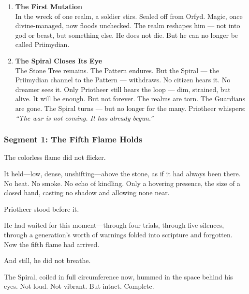 \documentclass[9pt]{article}
\begin{document}
\begin{enumerate}
    \vspace{1em}
    \item \textbf{The First Mutation} \\
    In the wreck of one realm, a soldier stirs. Sealed off from Orfyd. Magic, once divine-managed, now floods unchecked. The realm reshapes him — not into god or beast, but something else. He does not die. But he can no longer be called Priimydian.

    \vspace{1em}
    \item \textbf{The Spiral Closes Its Eye} \\
    The Stone Tree remains. The Pattern endures. But the Spiral — the Priimydian channel to the Pattern — withdraws. No citizen hears it. No dreamer sees it. Only Priotheer still hears the loop — dim, strained, but alive. It will be enough. But not forever. The realms are torn. The Guardians are gone. The Spiral turns — but no longer for the many. Priotheer whispers: \textit{“The war is not coming. It has already begun.”}
\end{enumerate}

\newpage

\subsubsection*{Segment 1: The Fifth Flame Holds}

The colorless flame did not flicker.

\vspace{0.5em}
It held---low, dense, unshifting---above the stone, as if it had always been there. No heat. No smoke. No echo of kindling. Only a hovering presence, the size of a closed hand, casting no shadow and allowing none near.

\vspace{0.5em}
Priotheer stood before it.

\vspace{0.5em}
He had waited for this moment---through four trials, through five silences, through a generation’s worth of warnings folded into scripture and forgotten. Now the fifth flame had arrived.

\vspace{0.5em}
And still, he did not breathe.

\vspace{0.5em}
The Spiral, coiled in full circumference now, hummed in the space behind his eyes. Not loud. Not vibrant. But intact. Complete.
\end{document}
